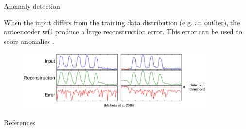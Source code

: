 \documentclass{beamer}
\begin{document}
  \begin{frame}{Anomaly detection}
    
    When the input differs from the training data distribution (e.g. an outlier), the autoencoder will produce a large reconstruction error. This error can be used to \alert{score anomalies} \cite{Malhotra2016}.

    \begin{figure}
      \includegraphics[width=10cm]{rc/anomaly-detection}
    \end{figure}

  \end{frame}

  \appendix

  \begin{frame}[allowframebreaks]{References}
    
    
    
  
  \end{frame}
\end{document}
